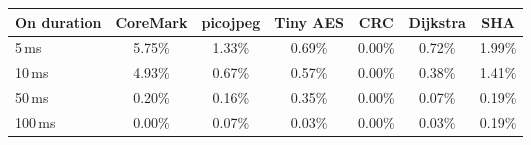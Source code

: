 \begin{tabular}{@{}l|cccccc@{}}
\toprule
\textbf{On duration} & \textbf{\textsf{CoreMark}} & \textbf{\textsf{picojpeg}} & \textbf{\textsf{Tiny AES}} & \textbf{\textsf{CRC}} & \textbf{\textsf{Dijkstra}} & \textbf{\textsf{SHA}} \\ \midrule
5\,ms & \colorbox{hightlight!28!white}{5.75\%} & \colorbox{hightlight!6!white}{1.33\%} & \colorbox{hightlight!3!white}{0.69\%} & \colorbox{hightlight!0!white}{0.00\%} & \colorbox{hightlight!3!white}{0.72\%} & \colorbox{hightlight!9!white}{1.99\%} \\
10\,ms & \colorbox{hightlight!24!white}{4.93\%} & \colorbox{hightlight!3!white}{0.67\%} & \colorbox{hightlight!2!white}{0.57\%} & \colorbox{hightlight!0!white}{0.00\%} & \colorbox{hightlight!1!white}{0.38\%} & \colorbox{hightlight!7!white}{1.41\%} \\
50\,ms & \colorbox{hightlight!0!white}{0.20\%} & \colorbox{hightlight!0!white}{0.16\%} & \colorbox{hightlight!1!white}{0.35\%} & \colorbox{hightlight!0!white}{0.00\%} & \colorbox{hightlight!0!white}{0.07\%} & \colorbox{hightlight!0!white}{0.19\%} \\
100\,ms & \colorbox{hightlight!0!white}{0.00\%} & \colorbox{hightlight!0!white}{0.07\%} & \colorbox{hightlight!0!white}{0.03\%} & \colorbox{hightlight!0!white}{0.00\%} & \colorbox{hightlight!0!white}{0.03\%} & \colorbox{hightlight!0!white}{0.19\%} \\
 \bottomrule
\end{tabular}
